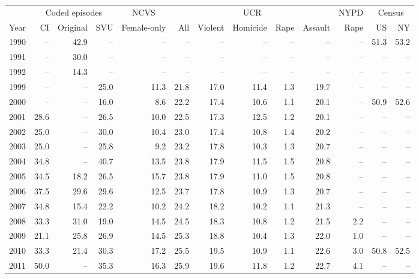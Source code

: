 \begin{center}
\label{tab:c_sex}
\small
\setlength{\tabcolsep}{3.5pt}
\renewcommand{\arraystretch}{1.08}
\begin{tabular}{@{}rrrrrrrrrrrrr@{}}
\toprule
 & \multicolumn{3}{c}{Coded episodes} & \multicolumn{1}{c}{NCVS} & \multicolumn{5}{c}{UCR} & \multicolumn{1}{c}{NYPD} & \multicolumn{2}{c}{Census} \\
\cmidrule(lr){2-4}
\cmidrule(lr){5-5}
\cmidrule(lr){6-10}
\cmidrule(lr){11-11}
\cmidrule(lr){12-13}
Year & CI & Original & SVU & Female-only & All & Violent & Homicide & Rape & Assault & Rape & US & NY \\
\midrule
1990 & -- & 42.9 & -- & -- & -- & -- & -- & -- & -- & -- & 51.3 & 53.2 \\
1991 & -- & 30.0 & -- & -- & -- & -- & -- & -- & -- & -- & -- & -- \\
1992 & -- & 14.3 & -- & -- & -- & -- & -- & -- & -- & -- & -- & -- \\
1999 & -- & -- & 25.0 & 11.3 & 21.8 & 17.0 & 11.4 & 1.3 & 19.7 & -- & -- & -- \\
2000 & -- & -- & 16.0 & 8.6 & 22.2 & 17.4 & 10.6 & 1.1 & 20.1 & -- & 50.9 & 52.6 \\
2001 & 28.6 & -- & 26.5 & 10.0 & 22.5 & 17.3 & 12.5 & 1.2 & 20.1 & -- & -- & -- \\
2002 & 25.0 & -- & 30.0 & 10.4 & 23.0 & 17.4 & 10.8 & 1.4 & 20.2 & -- & -- & -- \\
2003 & 25.0 & -- & 25.8 & 9.2 & 23.2 & 17.8 & 10.3 & 1.3 & 20.7 & -- & -- & -- \\
2004 & 34.8 & -- & 40.7 & 13.5 & 23.8 & 17.9 & 11.5 & 1.5 & 20.8 & -- & -- & -- \\
2005 & 34.5 & 18.2 & 26.5 & 15.7 & 23.8 & 17.9 & 11.0 & 1.5 & 20.8 & -- & -- & -- \\
2006 & 37.5 & 29.6 & 29.6 & 12.5 & 23.7 & 17.8 & 10.9 & 1.3 & 20.7 & -- & -- & -- \\
2007 & 34.8 & 15.4 & 22.2 & 10.2 & 24.2 & 18.2 & 10.2 & 1.1 & 21.3 & -- & -- & -- \\
2008 & 33.3 & 31.0 & 19.0 & 14.5 & 24.5 & 18.3 & 10.8 & 1.2 & 21.5 & 2.2 & -- & -- \\
2009 & 21.1 & 25.8 & 26.9 & 14.5 & 25.3 & 18.8 & 10.4 & 1.3 & 22.0 & 1.0 & -- & -- \\
2010 & 33.3 & 21.4 & 30.3 & 17.2 & 25.5 & 19.5 & 10.9 & 1.1 & 22.6 & 3.0 & 50.8 & 52.5 \\
2011 & 50.0 & -- & 35.3 & 16.3 & 25.9 & 19.6 & 11.8 & 1.2 & 22.7 & 4.1 & -- & -- \\

\end{tabular}
\end{center}
